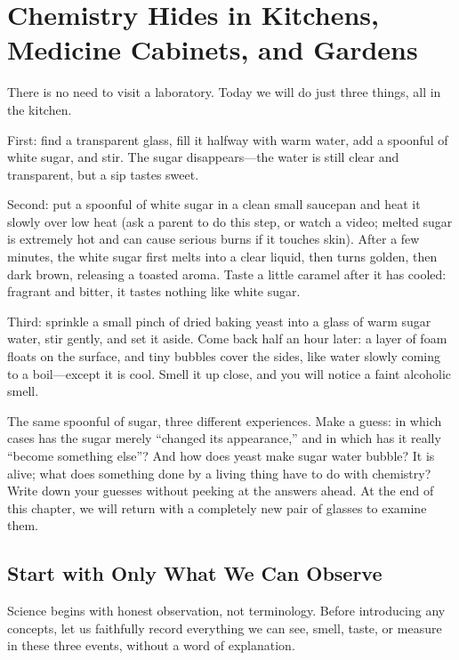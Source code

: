 \chapter{Chemistry Hides in Kitchens, Medicine Cabinets, and Gardens}

\begin{kaichang}
There is no need to visit a laboratory. Today we will do just three things, all in the kitchen.

First: find a transparent glass, fill it halfway with warm water, add a spoonful of white sugar, and stir. The sugar disappears---the water is still clear and transparent, but a sip tastes sweet.

Second: put a spoonful of white sugar in a clean small saucepan and heat it slowly over low heat (ask a parent to do this step, or watch a video; melted sugar is extremely hot and can cause serious burns if it touches skin). After a few minutes, the white sugar first melts into a clear liquid, then turns golden, then dark brown, releasing a toasted aroma. Taste a little caramel after it has cooled: fragrant and bitter, it tastes nothing like white sugar.

Third: sprinkle a small pinch of dried baking yeast into a glass of warm sugar water, stir gently, and set it aside. Come back half an hour later: a layer of foam floats on the surface, and tiny bubbles cover the sides, like water slowly coming to a boil---except it is cool. Smell it up close, and you will notice a faint alcoholic smell.

The same spoonful of sugar, three different experiences. Make a guess: in which cases has the sugar merely ``changed its appearance,'' and in which has it really ``become something else''? And how does yeast make sugar water bubble? It is alive; what does something done by a living thing have to do with chemistry? Write down your guesses without peeking at the answers ahead. At the end of this chapter, we will return with a completely new pair of glasses to examine them.
\end{kaichang}

\section{Start with Only What We Can Observe}

Science begins with honest observation, not terminology. Before introducing any concepts, let us faithfully record everything we can see, smell, taste, or measure in these three events, without a word of explanation.


